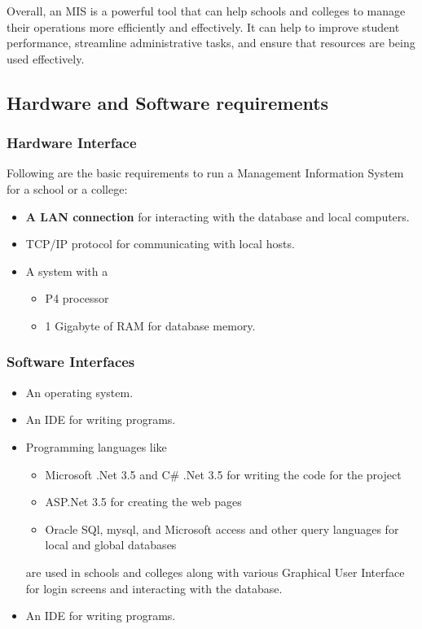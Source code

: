 \documentclass[twocolumn, 12pt, a4paper]{article}
\begin{document}
Overall, an MIS is a powerful tool that can help schools and colleges to manage their operations more efficiently and effectively. It can help to improve student performance, streamline administrative tasks, and ensure that resources are being used effectively.

\subsection{Hardware and Software requirements}
\subsubsection{Hardware Interface}
Following are the basic requirements to run a Management Information System 
for a school or a college:
\begin{itemize}
  \item \textbf{A LAN connection} for interacting with the database and local 
    computers.
  \item TCP/IP protocol for communicating with local hosts.
  \item A system with a
    \begin{itemize}
      \item P4 processor
      \item 1 Gigabyte of RAM for database memory.
    \end{itemize}
\end{itemize}

\subsubsection{Software Interfaces}
\begin{itemize}
  \item An operating system.
  \item An IDE for writing programs.
  \item Programming languages like
    \begin{itemize}
      \item Microsoft .Net 3.5 and C\# .Net 3.5 for writing the code for the
        project
      \item ASP.Net 3.5 for creating the web pages
      \item Oracle SQl, mysql, and Microsoft access and other query languages
        for local and global databases
    \end{itemize}
    are used in schools and colleges along with various Graphical User
    Interface for login screens and interacting with the database.
  \item An IDE for writing programs.
\end{itemize}
\end{document}
